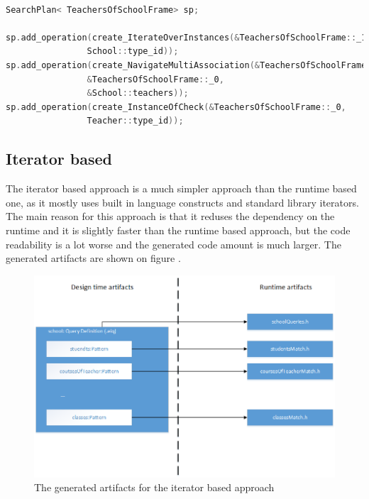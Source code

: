 \begin{lstlisting}[frame=single,float=!ht,language=C++,
label=listing:tos_gen_runtime, caption=Segment of the generated code for
teachers of school]

SearchPlan< TeachersOfSchoolFrame> sp;
		
sp.add_operation(create_IterateOverInstances(&TeachersOfSchoolFrame::_1,
				School::type_id));
sp.add_operation(create_NavigateMultiAssociation(&TeachersOfSchoolFrame::_1,
				&TeachersOfSchoolFrame::_0,
				&School::teachers));
sp.add_operation(create_InstanceOfCheck(&TeachersOfSchoolFrame::_0,
				Teacher::type_id));

\end{lstlisting}


\subsection{Iterator based}

The iterator based approach is a much simpler approach than the runtime based
one, as it mostly uses built in language constructs and standard library
iterators. The main reason for this approach is that it reduses the dependency
on the runtime and it is slightly faster than the runtime based approach, but
the code readability is a lot worse and the generated code amount is much
larger. The generated artifacts are shown on figure .

\begin{figure}[!ht]
\centering
\includegraphics[width=120mm, keepaspectratio]{figures/iterator_gen_art.png}
\caption{The generated artifacts for the iterator based approach}
\label{fig:iter_gen_art}
\end{figure}

